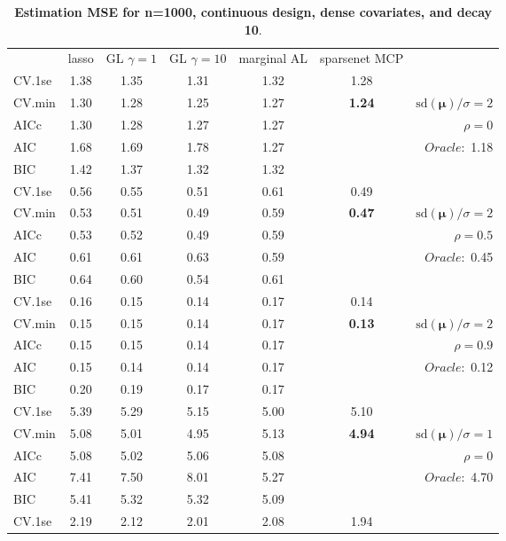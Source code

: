 \clearpage
\begin{table}\vspace{-.5cm}
\caption[l]{ { \bf Estimation MSE for n=1000, continuous design, 
dense covariates, and  decay  10}.}
\vspace{-.5cm}
\footnotesize{}
\begin{center}
\begin{tabular}{l*{5}{c}|r}
& lasso & GL $\gamma=1$ & GL $\gamma=10$ & marginal AL & sparsenet MCP  & \\
 \cline{1-7}
CV.1se & 1.38 & 1.35 & 1.31 & 1.32 & 1.28 & \\
CV.min & 1.30 & 1.28 & 1.25 & 1.27 & {\bf 1.24} &  $\mathrm{sd}(\mathbf{\mu})/\sigma=2$ \\
AICc & 1.30 & 1.28 & 1.27 & 1.27 & & $\rho=0$ \\
AIC & 1.68 & 1.69 & 1.78 & 1.27 & &  \multirow{2}{*}{$Oracle: $ 1.18} \\
BIC & 1.42 & 1.37 & 1.32 & 1.32 & &  \\
 \hline 
CV.1se & 0.56 & 0.55 & 0.51 & 0.61 & 0.49 & \\
CV.min & 0.53 & 0.51 & 0.49 & 0.59 & {\bf 0.47} &  $\mathrm{sd}(\mathbf{\mu})/\sigma=2$ \\
AICc & 0.53 & 0.52 & 0.49 & 0.59 & & $\rho=0.5$ \\
AIC & 0.61 & 0.61 & 0.63 & 0.59 & &  \multirow{2}{*}{$Oracle: $ 0.45} \\
BIC & 0.64 & 0.60 & 0.54 & 0.61 & &  \\
 \hline 
CV.1se & 0.16 & 0.15 & 0.14 & 0.17 & 0.14 & \\
CV.min & 0.15 & 0.15 & 0.14 & 0.17 & {\bf 0.13} &  $\mathrm{sd}(\mathbf{\mu})/\sigma=2$ \\
AICc & 0.15 & 0.15 & 0.14 & 0.17 & & $\rho=0.9$ \\
AIC & 0.15 & 0.14 & 0.14 & 0.17 & &  \multirow{2}{*}{$Oracle: $ 0.12} \\
BIC & 0.20 & 0.19 & 0.17 & 0.17 & &  \\
 \hline 
CV.1se & 5.39 & 5.29 & 5.15 & 5.00 & 5.10 & \\
CV.min & 5.08 & 5.01 & 4.95 & 5.13 & {\bf 4.94} &  $\mathrm{sd}(\mathbf{\mu})/\sigma=1$ \\
AICc & 5.08 & 5.02 & 5.06 & 5.08 & & $\rho=0$ \\
AIC & 7.41 & 7.50 & 8.01 & 5.27 & &  \multirow{2}{*}{$Oracle: $ 4.70} \\
BIC & 5.41 & 5.32 & 5.32 & 5.09 & &  \\
 \hline 
CV.1se & 2.19 & 2.12 & 2.01 & 2.08 & 1.94 & \\

\end{tabular}
\end{center}
\end{table}

